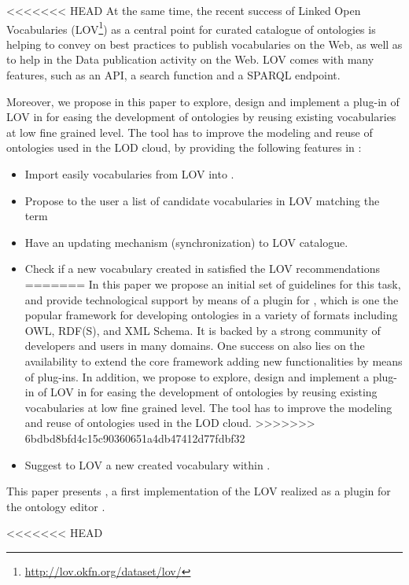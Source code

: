 <<<<<<< HEAD
At the same time, the recent success of Linked Open Vocabularies (LOV\footnote{\url{http://lov.okfn.org/dataset/lov/}}) as a central point for curated catalogue of ontologies is helping to convey on best practices to publish vocabularies on the Web, as well as to help in the Data publication activity on the Web. LOV comes with many features, such as an API, a search function and a SPARQL endpoint.
 
Moreover, we propose in this paper to explore, design and implement a plug-in of LOV in \protege for easing the development of ontologies by reusing existing vocabularies at low fine grained level. The tool has to improve the modeling and reuse of ontologies used in the LOD cloud, by providing the following features in \protege:

\begin{itemize}
\item Import easily vocabularies from LOV into \protege. 
\item Propose to the user a list of candidate vocabularies in LOV matching the term
\item Have an updating mechanism (synchronization) to LOV catalogue.
\item Check if a new vocabulary created in \protege satisfied the LOV recommendations \cite{pybernard12}
=======
In this paper we propose an initial set of guidelines for this task, and provide technological support by means of a plugin for \protege, which is one the popular framework for developing ontologies in a variety of formats including OWL, RDF(S), and XML Schema. It is backed by a strong community of developers and users in many domains. One success on \protege also lies on the availability to extend the core framework adding new functionalities by means of plug-ins. In addition, we propose to explore, design and implement a plug-in of LOV in \protege for easing the development of ontologies by reusing existing vocabularies at low fine grained level. The tool has to improve the modeling and reuse of ontologies used in the LOD cloud.
>>>>>>> 6bdbd8bfd4c15c90360651a4db47412d77fdbf32

\item Suggest to LOV a new created vocabulary within \protege.
\end{itemize}

This paper presents \protege, a first implementation of the LOV realized as a plugin for the ontology editor \protege. 
 
<<<<<<< HEAD

